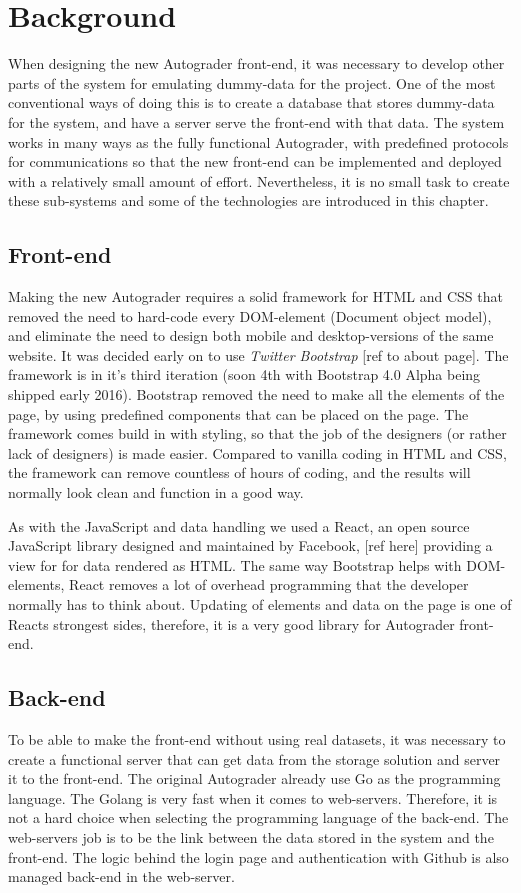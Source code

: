\chapter{Background}

When designing the new Autograder front-end, it was necessary to develop other parts of the system for emulating dummy-data for the project. One of the most conventional ways of doing this is to create a database that stores dummy-data for the system, and have a server serve the front-end with that data. The system works in many ways as the fully functional Autograder, with predefined protocols for communications so that the new front-end can be implemented and deployed with a relatively small amount of effort. Nevertheless, it is no small task to create these sub-systems and some of the technologies are introduced in this chapter.

\section{Front-end}
Making the new Autograder requires a solid framework for HTML and CSS that removed the need to hard-code every DOM-element (Document object model), and eliminate the need to design both mobile and desktop-versions of the same website. It was decided early on to use \textit{Twitter Bootstrap} [ref to about page]. The framework is in it's third iteration (soon 4th with Bootstrap 4.0 Alpha being shipped early 2016). Bootstrap removed the need to make all the elements of the page, by using predefined components that can be placed on the page. The framework comes build in with styling, so that the job of the designers (or rather lack of designers) is made easier. Compared to vanilla coding in HTML and CSS, the framework can remove countless of hours of coding, and the results will normally look clean and function in a good way.

As with the JavaScript and data handling we used a React, an open source JavaScript library designed and maintained by Facebook, [ref here] providing a view for for data rendered as HTML. The same way Bootstrap helps with DOM-elements, React removes a lot of overhead programming that the developer normally has to think about. Updating of elements and data on the page is one of Reacts strongest sides, therefore, it is a very good library for Autograder front-end. 

\section{Back-end}
To be able to make the front-end without using real datasets, it was necessary to create a functional server that can get data from the storage solution and server it to the front-end. The original Autograder already use Go as the programming language. The Golang is very fast when it comes to web-servers. Therefore, it is not a hard choice when selecting the programming language of the back-end. The web-servers job is to be the link between the data stored in the system and the front-end. The logic behind the login page and authentication with Github is also managed back-end in the web-server.

